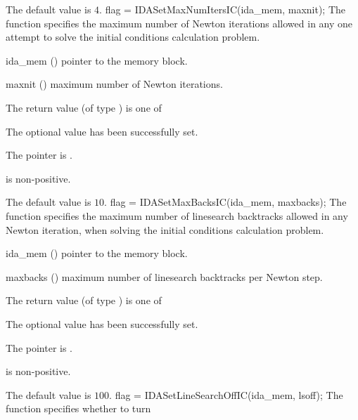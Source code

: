 {{\begin{args}
  \end{args}
}
{
  The default value is $4$.
}
{
flag = IDASetMaxNumItersIC(ida\_mem, maxnit);
}
{
  The function  specifies the maximum
  number of Newton iterations allowed in any one attempt to solve
  the initial conditions calculation problem.
}
{
  \begin{args}
  \item[ida\_mem] ()
    pointer to the {\ida} memory block.
  \item[maxnit] ()
    maximum number of Newton iterations.
  \end{args}
}
{
  The return value  (of type ) is one of
  \begin{args}
  \item[\Id{IDA\_SUCCESS}]
    The optional value has been successfully set.
  \item[\Id{IDA\_MEM\_NULL}]
    The  pointer is .
  \item[\Id{IDA\_ILL\_INPUT}]
     is non-positive.
  \end{args}
}
{
  The default value is $10$.
}
{
flag = IDASetMaxBacksIC(ida\_mem, maxbacks);
}
{
  The function  specifies the maximum number
  of linesearch backtracks allowed in any Newton iteration, when solving
  the initial conditions calculation problem.
}
{
  \begin{args}
  \item[ida\_mem] ()
    pointer to the {\ida} memory block.
  \item[maxbacks] ()
    maximum number of linesearch backtracks per Newton step.
  \end{args}
}
{
  The return value  (of type ) is one of
  \begin{args}
  \item[\Id{IDA\_SUCCESS}]
    The optional value has been successfully set.
  \item[\Id{IDA\_MEM\_NULL}]
    The  pointer is .
  \item[\Id{IDA\_ILL\_INPUT}]
     is non-positive.
  \end{args}
}
{
  The default value is $100$.
}
{
flag = IDASetLineSearchOffIC(ida\_mem, lsoff);
}
{
  The function  specifies whether to turn
}}

